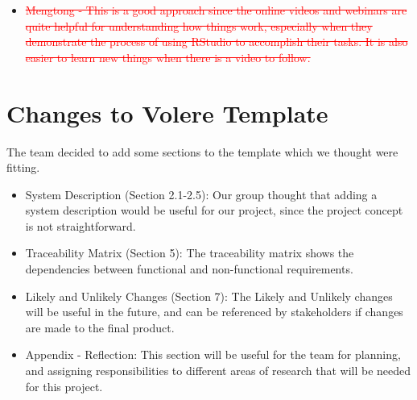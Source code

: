 \documentclass[12pt, titlepage]{article}
\begin{document}
\begin{itemize}
    \begin{itemize}
        \item \textcolor{red}{\sout{Mengtong - This is a good approach since the online videos and webinars are quite helpful for understanding how things work, especially when they demonstrate the process of using RStudio to accomplish their tasks. It is also easier to learn new things when there is a video to follow.}}
    \end{itemize}

\end{itemize}

\section{Changes to Volere Template}
The team decided to add some sections to the template which we thought were fitting.
\begin{itemize}
    \item System Description (Section 2.1-2.5): Our group thought that adding a system description would be useful for our project, since the project concept is not straightforward.
    \item Traceability Matrix (Section 5): The traceability matrix shows the dependencies between functional and non-functional requirements.
    \item Likely and Unlikely Changes (Section 7): The Likely and Unlikely changes will be useful in the future, and can be referenced by stakeholders if changes are made to the final product.
    \item Appendix - Reflection: This section will be useful for the team for planning, and assigning responsibilities to different areas of research that will be needed for this project.
\end{itemize}

\newpage



\end{document}
